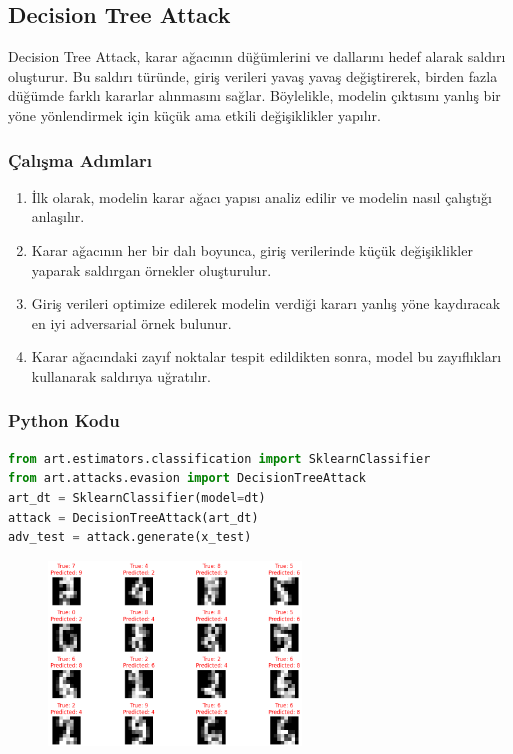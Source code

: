 \newpage

\subsection{Decision Tree Attack}

Decision Tree Attack, karar ağacının düğümlerini ve dallarını hedef alarak saldırı oluşturur. Bu saldırı türünde, giriş verileri yavaş yavaş değiştirerek, birden fazla düğümde farklı kararlar alınmasını sağlar. Böylelikle, modelin çıktısını yanlış bir yöne yönlendirmek için küçük ama etkili değişiklikler yapılır.

\subsubsection{Çalışma Adımları}

\begin{enumerate}
    \item İlk olarak, modelin karar ağacı yapısı analiz edilir ve modelin nasıl çalıştığı anlaşılır.
    \item Karar ağacının her bir dalı boyunca, giriş verilerinde küçük değişiklikler yaparak saldırgan örnekler oluşturulur.
    \item Giriş verileri optimize edilerek modelin verdiği kararı yanlış yöne kaydıracak en iyi adversarial örnek bulunur.
    \item Karar ağacındaki zayıf noktalar tespit edildikten sonra, model bu zayıflıkları kullanarak saldırıya uğratılır.
\end{enumerate}

\subsubsection{Python Kodu}

\begin{lstlisting}[language=Python]
from art.estimators.classification import SklearnClassifier
from art.attacks.evasion import DecisionTreeAttack
art_dt = SklearnClassifier(model=dt)
attack = DecisionTreeAttack(art_dt)
adv_test = attack.generate(x_test)
\end{lstlisting}

\begin{figure}[h]
    \centering
    \includegraphics[width=0.6\textwidth]{images/dt_attack_results.png}
    \caption{}
\end{figure}

